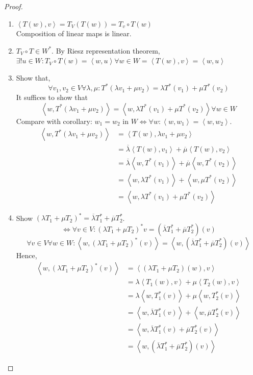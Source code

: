 \documentclass{article}
\numberwithin{lecref}{section}
\newcommand{\ip}[2]{\left\langle#1,#2\right\rangle} %
\begin{document}
\begin{proof}
  \begin{enumerate}
    \item $\ip{T(w)}{v} = T_V(T(w)) = T_v \circ T(w)$ \\
      Composition of linear maps is linear.
    \item $T_V \circ T \in W^*$. By Riesz representation theorem, $\exists! u \in W: T_V \circ T(w) = \ip{w}{u} \forall w \in W = \ip{T(w)}{v} = \ip wu$
    \item Show that,
      \[ \forall v_1, v_2 \in V \forall \lambda, \mu: T^*(\lambda v_1 + \mu v_2) = \lambda T^*(v_1) + \mu T^*(v_2) \]
      It suffices to show that
      \[ \ip{w}{T^*(\lambda v_1 + \mu v_2)} = \ip{w}{\lambda T^*(v_1) + \mu T^*(v_2)} \forall w \in W \]
      Compare with corollary: $w_1 = w_2$ in $W \iff \forall w: \ip{w}{w_1} = \ip{w}{w_2}$.
      \begin{align*}
        \ip{w}{T^*(\lambda v_1 + \mu v_2)} &= \ip{T(w)}{\lambda v_1 + \mu v_2} \\
          &= \overline{\lambda} \ip{T(w)}{v_1} + \overline{\mu} \ip{T(w)}{v_2} \\
          &= \overline{\lambda} \ip{w}{T^*(v_1)} + \overline{\mu} \ip{w}{T^*(v_2)} \\
          &= \ip{w}{\lambda T^*(v_1)} + \ip{w}{\mu T^*(v_2)} \\
          &= \ip{w}{\lambda T^*(v_1) + \mu T^*(v_2)}
      \end{align*}
    \item Show $(\lambda T_1 + \mu T_2)^* = \overline{\lambda} T_1^* + \overline{\mu} T_2^*$. \\
      \[ \iff \forall v \in V: (\lambda T_1 + \mu T_2)^* v = (\overline{\lambda} T_1^* + \overline{\mu} T_2^*)(v) \]
      \[ \forall v \in V \forall w \in W: \ip{w}{(\lambda T_1 + \mu T_2)^*(v)} = \ip{w}{(\overline{\lambda} T_1^* + \overline{\mu} T_2^*)(v)} \]
      Hence,
      \begin{align*}
        \ip{w}{(\lambda T_1 + \mu T_2)^*(v)}
          &= \ip{(\lambda T_1 + \mu T_2)(w)}{v} \\
          &= \lambda \ip{T_1(w)}{v} + \mu\ip{T_2(w)}{v} \\
          &= \lambda \ip{w}{T_1^*(v)} + \mu \ip{w}{T_2^*(v)} \\
          &= \ip{w}{\overline{\lambda} T_1^*(v)} + \ip{w}{\overline{\mu} T_2^*(v)} \\
          &= \ip{w}{\overline{\lambda} T_1^*(v) + \overline{\mu} T_2^*(v)} \\
          &= \ip{w}{(\overline\lambda T_1^* + \overline\mu T_2^*)(v)}
      \end{align*}


\end{enumerate}
\end{proof}
\end{document}

